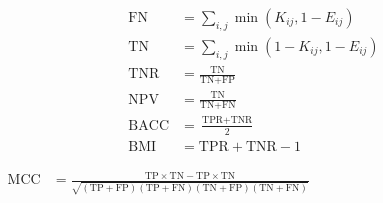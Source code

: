 \documentclass[runningheads]{llncs}
\begin{document}
\begin{minipage}[t]{0.50\textwidth}
\begin{align*}
\text{FN} &= \sum_{i,j} {\min}{\left( K_{ij}, 1-E_{ij} \right)} \\
\text{TN} &= \sum_{i,j} {\min}{\left( 1-K_{ij}, 1-E_{ij} \right)} \\
\text{TNR} &= \frac{\text{TN}} {\text{TN} + \text{FP}} \\
\text{NPV} &= \frac{\text{TN}} {\text{TN} + \text{FN}} \\
\text{BACC} &= \frac{\text{TPR} + \text{TNR}} {2} \\
\text{BMI} &= \text{TPR} + \text{TNR} - 1 %
\end{align*}
\end{minipage}
\begin{center}
  $ \displaystyle
      \begin{aligned}
\text{MCC} &= \frac{\text{TP} \times \text{TN} - \text{TP} \times \text{TN}}
                   {\sqrt{(\text{TP}+\text{FP})(\text{TP}+\text{FN})(\text{TN}+\text{FP})(\text{TN}+\text{FN})}}
    \end{aligned}
  $
\end{center}
\end{document}
